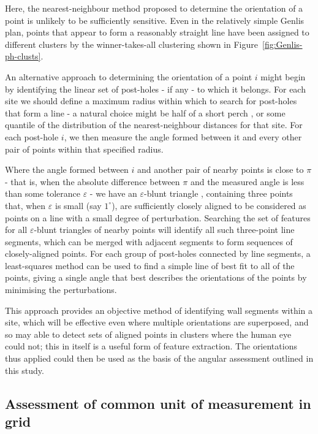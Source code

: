 \documentclass[../../ArchStats.tex]{subfiles}
\begin{document}
Here, the nearest-neighbour method proposed to determine the orientation of a point is unlikely to be sufficiently sensitive. Even in the relatively simple Genlis plan, points that appear to form a reasonably straight line have been assigned to different clusters by the winner-takes-all clustering shown in Figure~\ref{fig:Genlis-ph-clusts}. 

An alternative approach to determining the orientation of a point $i$ might begin by identifying the linear set of post-holes - if any - to which it belongs. For each site we should define a maximum radius within which to search for post-holes that form a line - a natural choice might be half of a short perch \cite{Blair2013}, or some quantile of the distribution of the nearest-neighbour distances for that site. For each post-hole $i$, we then measure the angle formed between it and every other pair of points within that specified radius.

Where the angle formed between $i$ and  another pair of nearby points is close to $\pi$ - that is, when the absolute difference between $\pi$ and the measured angle is less than some tolerance $\varepsilon$ - we have an $\varepsilon$-blunt triangle  \cite{Kendall1980}, containing three points that, when $\varepsilon$ is small (say $1^\circ$), are sufficiently closely aligned to be considered as points on a line with a small degree of perturbation. Searching the set of features for all $\varepsilon$-blunt triangles of nearby points will identify all such three-point line segments, which can be merged with adjacent segments to form sequences of closely-aligned points. For each group of post-holes connected by line segments, a least-squares method can be used to find a simple line of best fit to all of the points, giving a single angle that best describes the orientations of the points by minimising the perturbations.

This approach provides an objective method of identifying wall segments within a site, which will be effective even where multiple orientations are superposed, and so may able to detect sets of aligned points in clusters where the human eye could not; this in itself is a useful form of feature extraction. The orientations thus applied could then be used as the basis of the angular assessment outlined in this study.

\subsection{Assessment of common unit of measurement in grid}
\end{document}
